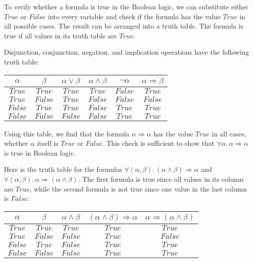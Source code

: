 To verify whether a formula is true in the Boolean logic, we can substitute
either $True$ or $False$ into every variable and check if the formula
has the value $True$ in all possible cases. The result can be arranged
into a truth table. The formula is true if all
values in its truth table are $True$.

Disjunction, conjunction, negation, and implication operations have
the following truth table:
\begin{center}
{\small{}}%
\begin{tabular}{|c|c|c|c|c|c|}
\hline 
{\small{}$\alpha$} & {\small{}$\beta$} & \textbf{\small{}$\alpha\vee\beta$} & \textbf{\small{}$\alpha\wedge\beta$} & \textbf{\small{}$\neg\alpha$} & \textbf{\small{}$\alpha\Rightarrow\beta$}\tabularnewline
\hline 
\hline 
{\small{}$True$} & {\small{}$True$} & {\small{}$True$} & {\small{}$True$} & {\small{}$False$} & {\small{}$True$}\tabularnewline
\hline 
{\small{}$True$} & {\small{}$False$} & {\small{}$True$} & {\small{}$False$} & {\small{}$False$} & {\small{}$False$}\tabularnewline
\hline 
{\small{}$False$} & {\small{}$True$} & {\small{}$True$} & {\small{}$False$} & {\small{}$True$} & {\small{}$True$}\tabularnewline
\hline 
{\small{}$False$} & {\small{}$False$} & {\small{}$False$} & {\small{}$False$} & {\small{}$True$} & {\small{}$True$}\tabularnewline
\hline 
\end{tabular}{\small\par}
\par\end{center}

Using this table, we find that the formula $\alpha\Rightarrow\alpha$
has the value $True$ in all cases, whether $\alpha$ itself is $True$
or $False$. This check is sufficient to show that $\forall\alpha.\,\alpha\Rightarrow\alpha$
is true in Boolean logic.

Here is the truth table for the formulas $\forall(\alpha,\beta).\,(\alpha\wedge\beta)\Rightarrow\alpha$
and $\forall(\alpha,\beta).\,\alpha\Rightarrow(\alpha\wedge\beta)$.
The first formula is true since all values in its column are $True$,
while the second formula is not true since one value in the last column
is $False$:
\begin{center}
{\small{}}%
\begin{tabular}{|c|c|c|c|c|}
\hline 
{\small{}$\alpha$} & {\small{}$\beta$} & \textbf{\small{}$\alpha\wedge\beta$} & {\small{}$(\alpha\wedge\beta)\Rightarrow\alpha$} & {\small{}$\alpha\Rightarrow(\alpha\wedge\beta)$}\tabularnewline
\hline 
\hline 
{\small{}$True$} & {\small{}$True$} & {\small{}$True$} & {\small{}$True$} & {\small{}$True$}\tabularnewline
\hline 
{\small{}$True$} & {\small{}$False$} & {\small{}$False$} & {\small{}$True$} & {\small{}$False$}\tabularnewline
\hline 
{\small{}$False$} & {\small{}$True$} & {\small{}$False$} & {\small{}$True$} & {\small{}$True$}\tabularnewline
\hline 
{\small{}$False$} & {\small{}$False$} & {\small{}$False$} & {\small{}$True$} & {\small{}$True$}\tabularnewline
\hline 
\end{tabular}{\small\par}
\par\end{center}

